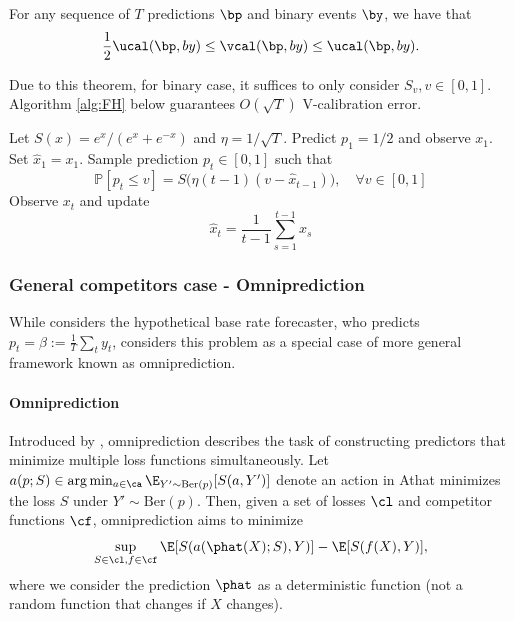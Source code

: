 \begin{theorem} \label{thm:ucal-vcal}
    For any sequence of $T$ predictions $\bp$ and binary events $\by$, we have that
    \[
    \frac{1}{2}\ucal(\bp,by) \leq \vcal(\bp,by) \leq \ucal(\bp,by).
    \]
\end{theorem}
Due to this theorem, for binary case, it suffices to only consider $S_v, v\in[0,1]$. Algorithm \ref{alg:FH} below guarantees $O(\sqrt{T})$ V-calibration error. 
\begin{algorithm}
\caption{\textsc{ForecastHedge}}\label{alg:FH}
\begin{algorithmic}[1]
\State Let $S(x) = e^x/(e^x + e^{-x})$ and $\eta = 1 / \sqrt{T}$.
\State Predict $p_1 = 1/2$ and observe $x_1$. Set $\hat{x}_1 = x_1$.
    \State Sample prediction $p_t \in [0,1]$ such that
    \[
        \mathbb{P}[p_t \le v] = S\bigl(\eta (t-1)(v - \hat{x}_{t-1})\bigr), \quad \forall v \in [0,1]
    \]
    \State Observe $x_t$ and update
    \[
        \hat{x}_t = \frac{1}{t-1} \sum_{s=1}^{t-1} x_s
    \]
\EndFor
\end{algorithmic}
\end{algorithm}

\subsubsection{General competitors case - Omniprediction}
While \cite{kleinberg2023ucal} considers the hypothetical base rate forecaster, who predicts $p_t=\beta:=\frac{1}{T}\sum_t y_t$, \cite{isaac2025omni} considers this problem as a special case of more general framework known as omniprediction.

\paragraph{Omniprediction} Introduced by \cite{gopalan2022omnipredictors}, omniprediction describes the task of constructing predictors that minimize multiple loss functions simultaneously. 
Let $a(p;S) \in \arg\min_{a\in\ca} \E_{Y'\sim\text{Ber}(p)}[S(a,Y')]$ denote an action in Athat minimizes the loss $S$ under $Y'\sim\text{Ber}(p)$. 
Then, given a set of losses $\cl$ and competitor functions $\cf$, omniprediction aims to minimize
\[
\sup_{S\in\cl, f\in\cf} \E[S(a(\phat(X);S), Y)] - \E[S(f(X), Y)],
\]
where we consider the prediction $\phat$ as a deterministic function (not a random function that changes if $X$ changes).

